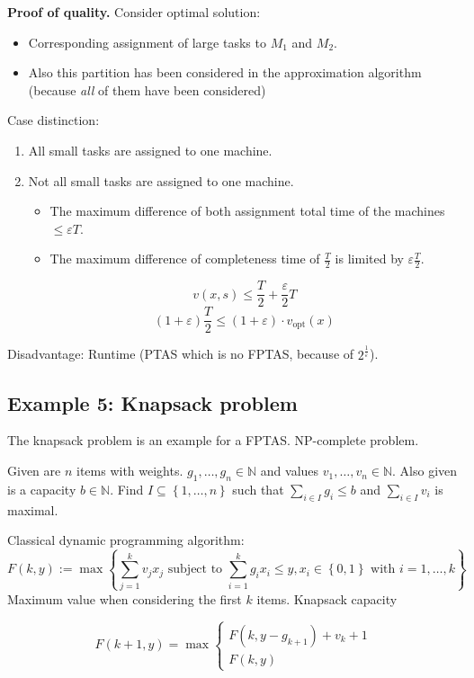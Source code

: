 \documentclass[a4paper]{article}
\newcommand{\cls}[1]{\rm{#1}}
\newcommand{\set}[1]{\left\{#1\right\}}
\begin{document}
\textbf{Proof of quality.}
Consider optimal solution:
\begin{itemize}
  \item Corresponding assignment of large tasks to $M_1$ and $M_2$.
  \item Also this partition has been considered in the approximation algorithm
        (because \emph{all} of them have been considered)
\end{itemize}

Case distinction:
\begin{enumerate}
  \item All small tasks are assigned to one machine.
  \item Not all small tasks are assigned to one machine.
    \begin{itemize}
      \item The maximum difference of both assignment
            total time of the machines $\leq \varepsilon T$.
      \item The maximum difference of completeness time
            of $\frac{T}{2}$ is limited by $\varepsilon\frac{T}{2}$.
    \end{itemize}
    \[
      v(x, s) \leq \frac{T}{2} + \frac{\varepsilon}{2} T
    \] \[
      (1 + \varepsilon) \frac{T}{2}
      \leq (1 + \varepsilon) \cdot v_{\text{opt}}(x)
    \]
\end{enumerate}

Disadvantage: Runtime (PTAS which is no \cls{FPTAS}, because of $2^{\frac1{\varepsilon}}$).

\subsection{Example 5: Knapsack problem}
\label{sec:approx-knapsack}
%
The knapsack problem is an example for a \cls{FPTAS}. \cls{NP}-complete problem.

Given are $n$ items with weights. $g_1, \ldots, g_n \in \mathbb{N}$ and
values $v_1, \ldots, v_n \in \mathbb{N}$. Also given is a capacity $b \in \mathbb{N}$.
Find $I \subseteq \set{1, \ldots, n}$ such that $\sum_{i \in I} g_i \leq b$ and
$\sum_{i \in I} v_i$ is maximal.

Classical dynamic programming algorithm:
\[
  F(k, y) := \max\set{\sum_{j = 1}^k v_j x_j \text{ subject to }
    \sum_{i = 1}^k g_i x_i \leq y, x_i \in \set{0, 1} \text{ with } i = 1, \ldots, k}
\]
Maximum value when considering the first $k$ items. Knapsack capacity

\[
  F(k + 1, y) = \max\begin{cases}
    F(k, y - g_{k+1}) + v_k + 1 \\
    F(k, y)
  \end{cases}
\]
\end{document}
